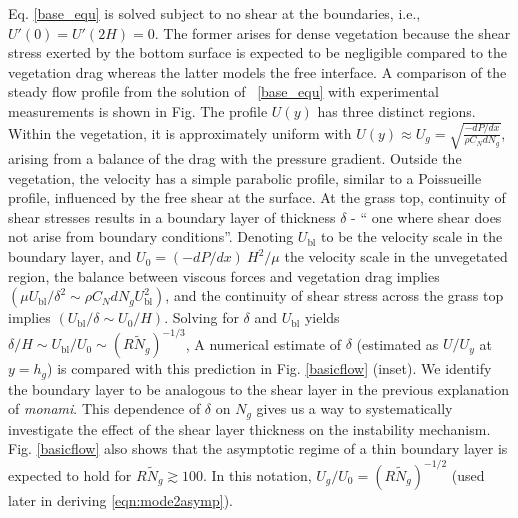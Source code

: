 \documentclass[12pt]{report}   %
\newcommand{\hg}{h_g}
\newcommand{\Rey}{{R}}
\newcommand{\Ndg}{\tilde{N}_g}
\newcommand{\monami}{\textit{monami}}
\newcommand{\ubl}{U_\text{bl}}
\newcommand{\ReyNdg}{{\Rey\Ndg}}
\begin{document}
Eq. \eqref{base_equ} is solved subject to no shear at the boundaries, i.e., $U'(0) = U'(2H) = 0$.
The former arises for dense vegetation because the shear stress exerted by the bottom surface is expected to be negligible compared to the vegetation drag \cite{Nepf04 } whereas the latter models the free interface. 
A comparison of the steady flow profile from the solution of ~\eqref{base_equ} with experimental measurements is shown in Fig.
The profile $U(y)$ has three distinct regions.
Within the vegetation, it is approximately uniform with $ U(y) \approx U_g = \sqrt{\frac{-dP/dx}{\rho C_N dN_g}}$, arising from a balance of the drag with the pressure gradient. 
Outside the vegetation, the velocity has a simple parabolic profile, similar to a Poissueille profile, influenced by the free shear at the surface. 
At the grass top, continuity of shear stresses results in a boundary layer of thickness $\delta$ - `` one where shear does not arise from boundary conditions''. Denoting $\ubl$ to be the velocity scale in the boundary layer, and $U_0 = {(-dP/dx)~H^2}/{\mu}$ the velocity scale in the unvegetated region, the balance between viscous forces and vegetation drag implies $(\mu \ubl/\delta^2 \sim \rho C_N d N_g \ubl^2)$, and the continuity of shear stress across the grass top implies $(\ubl/\delta \sim U_0/H)$.
Solving for $\delta$ and $\ubl$ yields $\delta/H \sim \ubl/U_0 \sim (\Rey \Ndg )^{-1/3}$, %
A numerical estimate of $\delta$ (estimated as $U/U_y$ at $y=\hg$) is compared with this prediction in Fig. \ref{basicflow} (inset).
We identify the boundary layer to be analogous to the shear layer \cite{Ghisal02,Nepf04} in the previous explanation of \monami.
This dependence of $\delta$ on $N_g$ gives us a way to systematically investigate the effect of the shear layer thickness on the instability mechanism.
Fig. \ref{basicflow} also shows that the asymptotic regime of a thin boundary layer is expected to hold for $\ReyNdg \gtrsim 100$. 
In this notation, $U_g/U_0 = (\Rey \Ndg)^{-1/2}$ (used later in deriving \eqref{eqn:mode2asymp}). 
\end{document}
